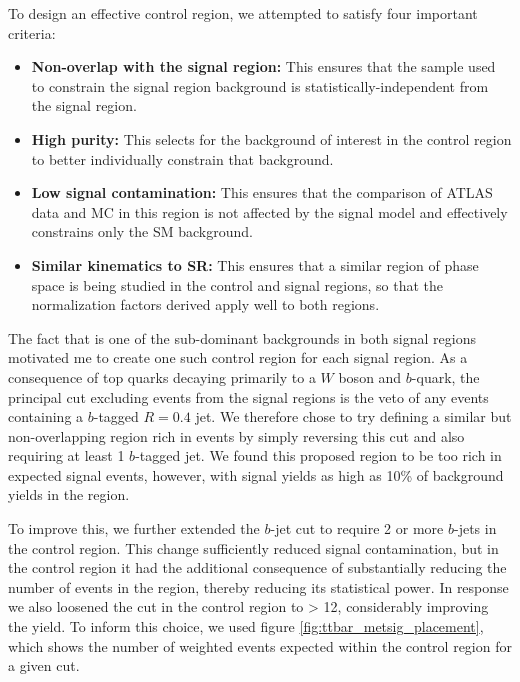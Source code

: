 To design an effective control region, we attempted to satisfy four important criteria:
\begin{itemize}
  \item \textbf{Non-overlap with the signal region:} This ensures that the sample used to constrain the signal region background is statistically-independent from the signal region.
  \item \textbf{High \ttbar purity:} This selects for the background of interest in the control region to better individually constrain that background.
  \item \textbf{Low signal contamination:} This ensures that the comparison of ATLAS data and MC in this region is not affected by the signal model and effectively constrains only the SM background.
  \item \textbf{Similar kinematics to SR:} This ensures that a similar region of phase space is being studied in the control and signal regions, so that the normalization factors derived apply well to both regions.
\end{itemize}

The fact that \ttbar is one of the sub-dominant backgrounds in both signal regions motivated me to create one such control region for each signal region. As a consequence of top quarks decaying primarily to a $W$ boson and $b$-quark, the principal cut excluding \ttbar events from the signal regions is the veto of any events containing a $b$-tagged \akt $R=0.4$ jet. We therefore chose to try defining a similar but non-overlapping region rich in \ttbar events by simply reversing this cut and also requiring at least 1 $b$-tagged jet. We found this proposed region to be too rich in expected signal events, however, with signal yields as high as 10\% of background yields in the \merged region.

To improve this, we further extended the $b$-jet cut to require 2 or more $b$-jets in the control region. This change sufficiently reduced signal contamination, but in the \merged control region it had the additional consequence of substantially reducing the number of events in the region, thereby reducing its statistical power.  In response we also loosened the \metsig cut in the \merged \ttbar control region to \metsig > 12, considerably improving the \ttbar yield. To inform this choice, we used figure \ref{fig:ttbar_metsig_placement}, which shows the number of weighted \ttbar events expected within the \merged control region for a given \metsig cut.

